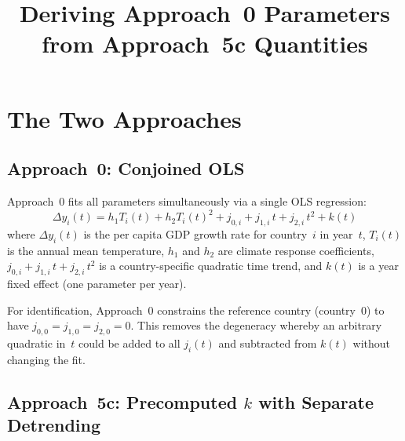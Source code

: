 \documentclass[11pt]{article}
\title{Deriving Approach~0 Parameters from Approach~5c Quantities}
\author{}
\date{}
\begin{document}
\maketitle

\section{The Two Approaches}

\subsection{Approach~0: Conjoined OLS}

Approach~0 fits all parameters simultaneously via a single OLS regression:
\begin{equation}
\Delta y_i(t) = h_1 T_i(t) + h_2 T_i(t)^2 + j_{0,i} + j_{1,i}\,t + j_{2,i}\,t^2 + k(t)
\label{eq:approach0}
\end{equation}
where $\Delta y_i(t)$ is the per capita GDP growth rate for country~$i$ in year~$t$,
$T_i(t)$ is the annual mean temperature, $h_1$ and $h_2$ are climate response coefficients,
$j_{0,i} + j_{1,i}\,t + j_{2,i}\,t^2$ is a country-specific quadratic time trend,
and $k(t)$ is a year fixed effect (one parameter per year).

For identification, Approach~0 constrains the reference country (country~0) to have
$j_{0,0} = j_{1,0} = j_{2,0} = 0$.
This removes the degeneracy whereby an arbitrary quadratic in~$t$ could be added to
all $j_i(t)$ and subtracted from $k(t)$ without changing the fit.

\subsection{Approach~5c: Precomputed $k$ with Separate Detrending}
\end{document}
